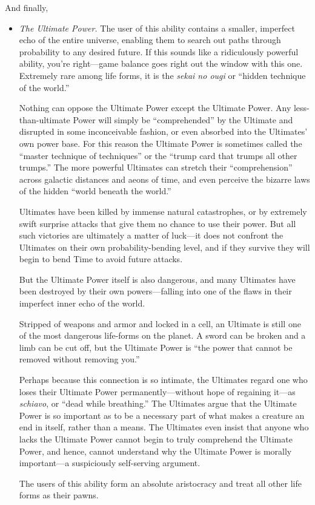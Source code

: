 {
 And finally,}

\begin{itemize}
\item {
  \textit{The Ultimate Power.} The user of this ability contains a
smaller, imperfect echo of the entire universe, enabling them to search
out paths through probability to any desired future. If this sounds
like a ridiculously powerful ability, you're
right---game balance goes right out the window with this one. Extremely
rare among life forms, it is the \textit{sekai no ougi} or
``hidden technique of the world.''

Nothing can oppose the Ultimate Power except the Ultimate Power. Any
less-than-ultimate Power will simply be
``comprehended'' by the Ultimate and
disrupted in some inconceivable fashion, or even absorbed into the
Ultimates' own power base. For this reason the Ultimate
Power is sometimes called the ``master technique of
techniques'' or the ``trump card
that trumps all other trumps.'' The more powerful
Ultimates can stretch their
``comprehension'' across galactic
distances and aeons of time, and even perceive the bizarre laws of the
hidden ``world beneath the world.''

Ultimates have been killed by immense natural catastrophes, or by
extremely swift surprise attacks that give them no chance to use their
power. But all such victories are ultimately a matter of luck---it does
not confront the Ultimates on their own probability-bending level, and
if they survive they will begin to bend Time to avoid future attacks.

But the Ultimate Power itself is also dangerous, and many Ultimates
have been destroyed by their own powers---falling into one of the flaws
in their imperfect inner echo of the world.

Stripped of weapons and
armor and locked in a cell, an Ultimate is still one of the most
dangerous life-forms on the planet. A sword can be broken and a limb
can be cut off, but the Ultimate Power is ``the power
that cannot be removed without removing you.''

Perhaps because this connection is so intimate, the Ultimates regard
one who loses their Ultimate Power permanently---without hope of
regaining it---as \textit{schiavo}, or ``dead while
breathing.'' The Ultimates argue that the Ultimate
Power is so important as to be a necessary part of what makes a
creature an end in itself, rather than a means. The Ultimates even
insist that anyone who lacks the Ultimate Power cannot begin to truly
comprehend the Ultimate Power, and hence, cannot understand why the
Ultimate Power is morally important---a suspiciously self-serving
argument.

The users of this ability form an absolute aristocracy and
treat all other life forms as their pawns. }
\end{itemize}


